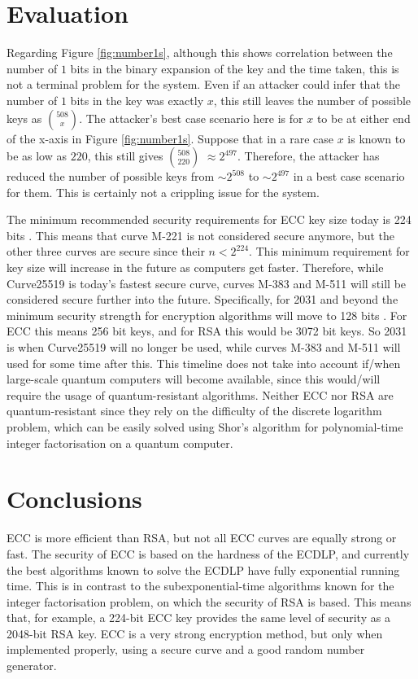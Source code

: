 \documentclass[12pt,a4paper]{article}
\begin{document}
\section{Evaluation} \noindent
Regarding Figure \ref{fig:number1s}, although this shows correlation between the number of $1$ bits in the binary expansion of the key 
and the time taken, this is not a terminal problem for the system. 
Even if an attacker could infer that the number of $1$ bits in the key was exactly $x$, 
this still leaves the number of possible keys as $508 \choose x$. 
The attacker's best case scenario here is for $x$ to be at either end of the x-axis in Figure \ref{fig:number1s}. 
Suppose that in a rare case $x$ is known to be as low as $220$, this still gives $508 \choose 220$ $\approx 2^{497}$. 
Therefore, the attacker has reduced the number of possible keys from $\sim 2^{508}$ to $\sim 2^{497}$ in a best case scenario for them. 
This is certainly not a crippling issue for the system. 

The minimum recommended security requirements for ECC key size today is 224 bits \cite[p54-55]{barker2020recommendation}. 
This means that curve M-221 is not considered secure anymore, but the other three curves are secure since their $n < 2^{224}$. 
This minimum requirement for key size will increase in the future as computers get faster. 
Therefore, while Curve25519 is today's fastest secure curve, 
curves M-383 and M-511 will still be considered secure further into the future. 
Specifically, for 2031 and beyond the minimum security strength for encryption algorithms will move to 128 bits \cite[p59]{barker2020recommendation}. 
For ECC this means 256 bit keys, and for RSA this would be 3072 bit keys. 
So 2031 is when Curve25519 will no longer be used, while curves M-383 and M-511 will used for some time after this. 
This timeline does not take into account if/when large-scale quantum computers will become available, 
since this would/will require the usage of quantum-resistant algorithms. 
Neither ECC nor RSA are quantum-resistant since they rely on the difficulty of the discrete logarithm problem, 
which can be easily solved using Shor's algorithm for polynomial-time integer factorisation on a quantum computer. 


\section{Conclusions} \noindent
ECC is more efficient than RSA, but not all ECC curves are equally strong or fast. 
The security of ECC is based on the hardness of the ECDLP, 
and currently the best algorithms known to solve the ECDLP have fully exponential running time. 
This is in contrast to the subexponential-time algorithms known for the integer factorisation problem, on which the security of RSA is based. 
This means that, for example, a 224-bit ECC key provides the same level of security as a 2048-bit RSA key. 
ECC is a very strong encryption method, but only when implemented properly, 
using a secure curve and a good random number generator. 
\end{document}

